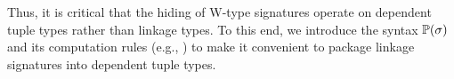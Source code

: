 %
%

Thus, it is critical that the hiding of W-type signatures operate on dependent
tuple types rather than linkage types.
To this end, we introduce the syntax $\mathbb{P}({\sigma})$ and its computation rules
(e.g., ) to make it convenient to package linkage signatures
into dependent tuple types.







